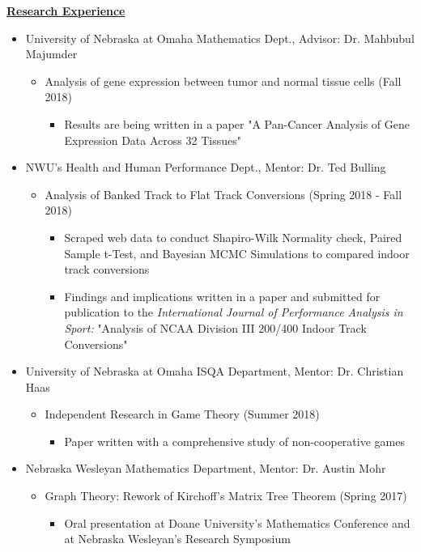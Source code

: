 \documentclass[10pt]{article}
\begin{document}
\underline{\textbf{Research Experience}}

\begin{itemize}
\item University of Nebraska at Omaha Mathematics Dept., Advisor: Dr. Mahbubul Majumder
\begin{itemize}
\item Analysis of gene expression between tumor and normal tissue cells (Fall 2018)
\begin{itemize}
\item Results are being written in a paper "A Pan-Cancer Analysis of Gene Expression Data Across 32 Tissues"
\end{itemize}
\end{itemize}
\item NWU's Health and Human Performance Dept., Mentor: Dr. Ted Bulling
\begin{itemize}
\item Analysis of Banked Track to Flat Track Conversions (Spring 2018 - Fall 2018)
\begin{itemize}
\item Scraped web data to conduct Shapiro-Wilk Normality check, Paired Sample t-Test, and Bayesian MCMC Simulations to compared indoor track conversions
\item Findings and implications written in a paper and submitted for publication to the \textit{International Journal of Performance Analysis in Sport:} "Analysis of NCAA Division III 200/400 Indoor Track Conversions"
\end{itemize}
\end{itemize}
\item University of Nebraska at Omaha ISQA Department, Mentor: Dr. Christian Haas
\begin{itemize}
\item Independent Research in Game Theory (Summer 2018)
\begin{itemize}
\item Paper written with a comprehensive study of non-cooperative games
\end{itemize}
\end{itemize}
\item Nebraska Wesleyan Mathematics Department, Mentor: Dr. Austin Mohr
\begin{itemize}
\item Graph Theory: Rework of Kirchoff's Matrix Tree Theorem (Spring 2017)
\begin{itemize}
\item Oral presentation at Doane University's Mathematics Conference and at Nebraska Wesleyan's Research Symposium

\end{itemize}
\end{itemize}
\end{itemize}
\end{document}
